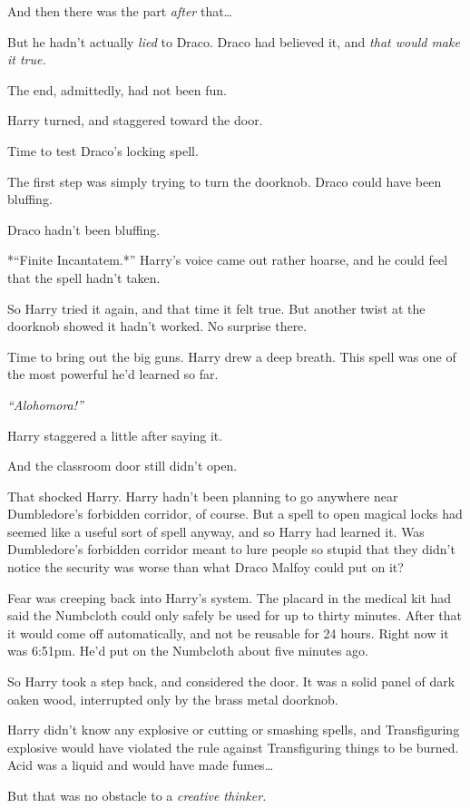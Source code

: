 And then there was the part \emph{after} that\ldots{}

But he hadn't actually \emph{lied} to Draco. Draco had believed it, and
\emph{that would make it true.}

The end, admittedly, had not been fun.

Harry turned, and staggered toward the door.

Time to test Draco's locking spell.

The first step was simply trying to turn the doorknob. Draco could have
been bluffing.

Draco hadn't been bluffing.

*``Finite Incantatem.*'' Harry's voice came out rather hoarse, and he
could feel that the spell hadn't taken.

So Harry tried it again, and that time it felt true. But another twist
at the doorknob showed it hadn't worked. No surprise there.

Time to bring out the big guns. Harry drew a deep breath. This spell was
one of the most powerful he'd learned so far.

\emph{``Alohomora!''}

Harry staggered a little after saying it.

And the classroom door still didn't open.

That shocked Harry. Harry hadn't been planning to go anywhere near
Dumbledore's forbidden corridor, of course. But a spell to open magical
locks had seemed like a useful sort of spell anyway, and so Harry had
learned it. Was Dumbledore's forbidden corridor meant to lure people so
stupid that they didn't notice the security was worse than what Draco
Malfoy could put on it?

Fear was creeping back into Harry's system. The placard in the medical
kit had said the Numbcloth could only safely be used for up to thirty
minutes. After that it would come off automatically, and not be reusable
for 24 hours. Right now it was 6:51pm. He'd put on the Numbcloth about
five minutes ago.

So Harry took a step back, and considered the door. It was a solid panel
of dark oaken wood, interrupted only by the brass metal doorknob.

Harry didn't know any explosive or cutting or smashing spells, and
Transfiguring explosive would have violated the rule against
Transfiguring things to be burned. Acid was a liquid and would have made
fumes\ldots{}

But that was no obstacle to a \emph{creative thinker.}

